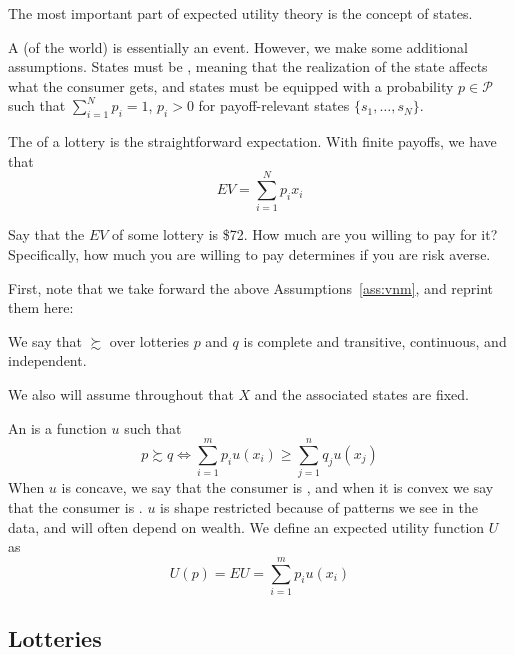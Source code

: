 \documentclass[12pt]{article}
\begin{document}
The most important part of expected utility theory is the concept of states. 

\begin{definition}
	A  (of the world) is essentially an event. However, we make some additional assumptions. States must be , meaning that the realization of the state affects what the consumer gets, and states must be equipped with a probability $p \in \mathcal{P}$ such that $\sum_{i=1}^N p_i = 1$, $p_i > 0$ for payoff-relevant states $\{s_1,\dots,s_N\}$.
\end{definition}

\begin{definition}
	The  of a lottery is the straightforward expectation. With finite payoffs, we have that
	\[
	EV = \sum_{i=1}^N p_i x_i
	\]
\end{definition}

\begin{question}
	Say that the $EV$ of some lottery is \$72. How much are you willing to pay for it? Specifically, how much you are willing to pay determines if you are risk averse.
\end{question}

First, note that we take forward the above Assumptions~\ref{ass:vnm}, and reprint them here:

\begin{assumption}\label{ass:vnm_5}
	We say that $\succsim$ over lotteries $p$ and $q$ is complete and transitive, continuous, and independent.
\end{assumption}

We also will assume throughout that $X$ and the associated states are fixed.

\begin{definition}
	An  is a function $u$ such that
	\[
	p \succsim q \Longleftrightarrow \sum_{i=1}^m p_i u(x_i) \ge \sum_{j=1}^n q_j u(x_j)
	\]
	When $u$ is concave, we say that the consumer is , and when it is convex we say that the consumer is . $u$ is shape restricted because of patterns we see in the data, and will often depend on wealth. We define an expected utility function $U$ as
	\[
	U(p) = EU = \sum_{i=1}^m p_i u(x_i)
	\]
\end{definition}

\subsection{Lotteries}
\end{document}
